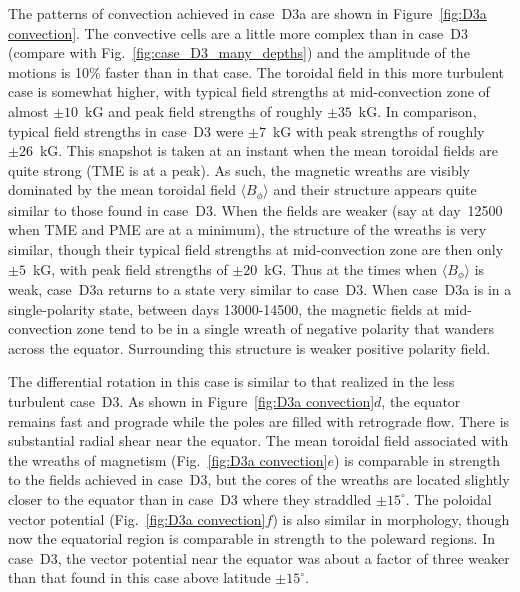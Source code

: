 The patterns of convection achieved in case~D3a are shown in
Figure~\ref{fig:D3a convection}.  The convective cells are a little
more complex than in case~D3 (compare with
Fig.~\ref{fig:case_D3_many_depths}) and the amplitude of the motions
is  10\% faster than in that case.  The toroidal field in this more
turbulent case is somewhat higher, with typical field strengths at
mid-convection zone of almost $\pm10$~kG and peak field strengths of roughly $\pm35$~kG.  In
comparison, typical field strengths in case~D3 were $\pm7$~kG with
peak strengths of roughly $\pm 26$~kG.  This snapshot is taken at an
instant when the mean toroidal fields are quite strong (TME is at a
peak). As such, the magnetic wreaths are
visibly dominated by the mean toroidal field $\langle B_\phi
\rangle$ and their structure appears quite similar to those found in
case~D3.  When the fields are weaker (say at day~12500 when TME and
PME are at a minimum), the structure of the wreaths is very similar,
though their typical field strengths at mid-convection zone are then
only $\pm 5$~kG, with peak field strengths of $\pm 20$~kG.  Thus at
the times when $\langle B_\phi \rangle$ is weak, case~D3a returns to
a state very similar to case~D3.
When case~D3a is in a single-polarity state, between days 13000-14500,
the magnetic fields at mid-convection zone tend to be in a single
wreath of negative polarity that wanders across the equator.
Surrounding this structure is weaker positive polarity field.  

The differential rotation in this case is similar to that
realized in the less turbulent case~D3.  As shown in
Figure~\ref{fig:D3a convection}$d$, the equator remains fast
and prograde while the poles are filled with retrograde flow.
There is substantial radial shear near the equator.  The mean toroidal
field associated with the wreaths of magnetism 
(Fig.~\ref{fig:D3a convection}$e$) is comparable in strength to the fields achieved in
case~D3, but the cores of the wreaths are located slightly closer to
the equator than in case~D3 where they straddled $\pm 15^\circ$.  The
poloidal vector potential (Fig.~\ref{fig:D3a convection}$f$) is also
similar in morphology, though now the equatorial region is comparable
in strength to the poleward regions.  In case~D3, the vector potential
near the equator was about a factor of three weaker than that found in
this case above latitude $\pm15^\circ$.


